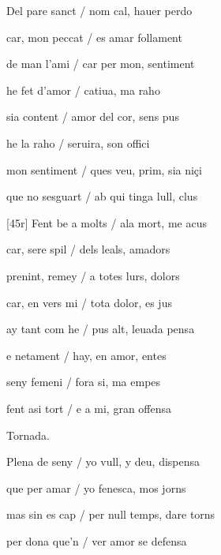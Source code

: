 \documentclass[12pt]{article}
\begin{document}
\begin{estrofa}

 Del pare sanct / nom cal, hauer perdo

 car, mon peccat / es amar follament

 de man l'ami / car per mon, sentiment

 he fet d'amor / catiua, ma raho

 sia content / amor del cor, sens pus

 he la  raho / seruira, son offici

 mon sentiment / ques veu, prim, sia ni\c{c}i

 que no sesguart / ab qui tinga lull, clus

\end{estrofa}



\begin{estrofa}

 [45r] Fent be a molts / ala mort, me acus

 car, sere spil / dels leals, amadors

 prenint, remey / a totes lurs, dolors

 car, en vers mi / tota dolor, es jus

 ay tant com he / pus alt, leuada pensa

 e netament / hay, en amor, entes

 seny femeni / fora si, ma empes

 fent asi tort / e a mi, gran offensa

\end{estrofa}


\begin{estrofaExtra}%




\begin{tornada}

Tornada.

\end{tornada}


\end{estrofaExtra}


\begin{estrofa}

 Plena de seny / yo vull, y deu, dispensa

 que per amar / yo fenesca, mos jorns

 mas sin es cap / per null temps, dare torns

 per dona que'n / ver amor se defensa

\end{estrofa}
\end{document}
